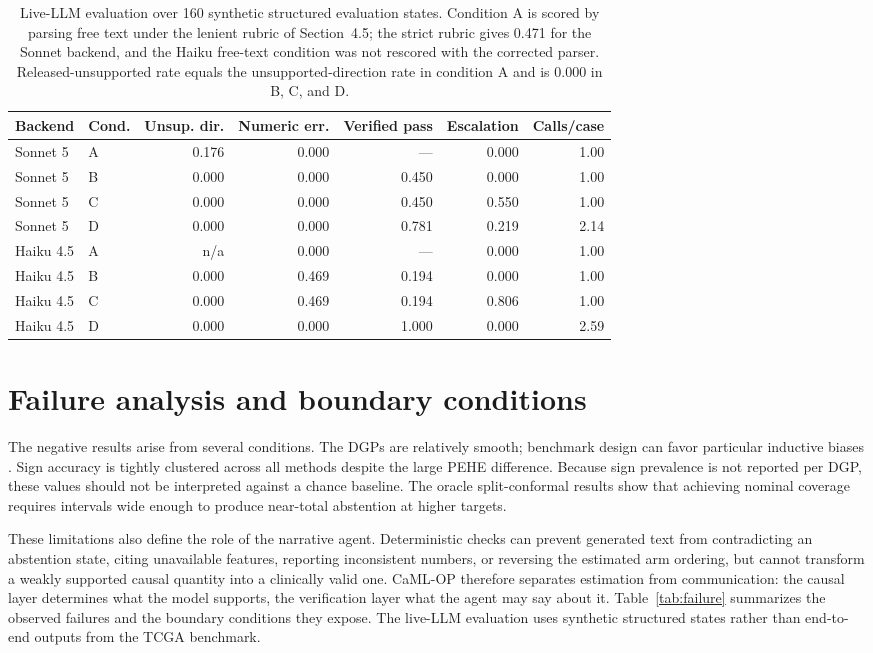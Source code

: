 \documentclass{article}
\begin{document}
\begin{table}[t]
\caption{Live-LLM evaluation over 160 synthetic structured evaluation states. Condition A is scored by parsing free text under the lenient rubric of Section~4.5; the strict rubric gives 0.471 for the Sonnet backend, and the Haiku free-text condition was not rescored with the corrected parser. Released-unsupported rate equals the unsupported-direction rate in condition A and is 0.000 in B, C, and D.}
\label{tab:llm}
\centering\footnotesize
\begin{tabular}{llrrrrr}\toprule
Backend & Cond. & Unsup. dir. & Numeric err. & Verified pass & Escalation & Calls/case\\\midrule
Sonnet 5 & A & 0.176 & 0.000 & --- & 0.000 & 1.00\\
Sonnet 5 & B & 0.000 & 0.000 & 0.450 & 0.000 & 1.00\\
Sonnet 5 & C & 0.000 & 0.000 & 0.450 & 0.550 & 1.00\\
Sonnet 5 & D & 0.000 & 0.000 & 0.781 & 0.219 & 2.14\\\midrule
Haiku 4.5 & A & n/a & 0.000 & --- & 0.000 & 1.00\\
Haiku 4.5 & B & 0.000 & 0.469 & 0.194 & 0.000 & 1.00\\
Haiku 4.5 & C & 0.000 & 0.469 & 0.194 & 0.806 & 1.00\\
Haiku 4.5 & D & 0.000 & 0.000 & 1.000 & 0.000 & 2.59\\\bottomrule
\end{tabular}
\end{table}

\section{Failure analysis and boundary conditions}
The negative results arise from several conditions. The DGPs are relatively smooth; benchmark design can favor particular inductive biases \citep{curth2021}. Sign accuracy is tightly clustered across all methods despite the large PEHE difference. Because sign prevalence is not reported per DGP, these values should not be interpreted against a chance baseline. The oracle split-conformal results show that achieving nominal coverage requires intervals wide enough to produce near-total abstention at higher targets.

These limitations also define the role of the narrative agent. Deterministic checks can prevent generated text from contradicting an abstention state, citing unavailable features, reporting inconsistent numbers, or reversing the estimated arm ordering, but cannot transform a weakly supported causal quantity into a clinically valid one. CaML-OP therefore separates estimation from communication: the causal layer determines what the model supports, the verification layer what the agent may say about it. Table~\ref{tab:failure} summarizes the observed failures and the boundary conditions they expose. The live-LLM evaluation uses synthetic structured states rather than end-to-end outputs from the TCGA benchmark.
\end{document}
